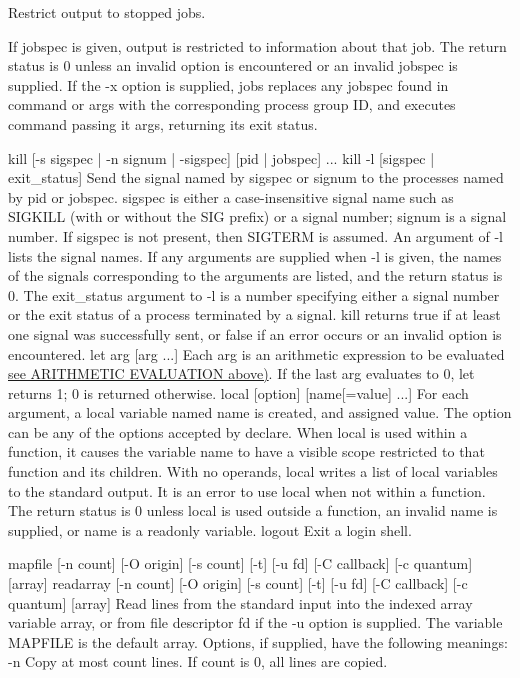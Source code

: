 Restrict output to stopped jobs.

If jobspec is given, output is restricted to information about that job. The return status is 0 unless an invalid option is encountered or an invalid jobspec is supplied.
If the -x option is supplied, jobs replaces any jobspec found in command or args with the corresponding process group ID, and executes command passing it args, returning its exit status.

kill [-s sigspec | -n signum | -sigspec] [pid | jobspec] ...
kill -l [sigspec | exit\_status]
Send the signal named by sigspec or signum to the processes named by pid or jobspec. sigspec is either a case-insensitive signal name such as SIGKILL (with or without the SIG prefix) or a signal number; signum is a signal number. If sigspec is not present, then SIGTERM is assumed. An argument of -l lists the signal names. If any arguments are supplied when -l is given, the names of the signals corresponding to the arguments are listed, and the return status is 0. The exit\_status argument to -l is a number specifying either a signal number or the exit status of a process terminated by a signal. kill returns true if at least one signal was successfully sent, or false if an error occurs or an invalid option is encountered.
let arg [arg ...]
Each arg is an arithmetic expression to be evaluated \hyperref[sec:arithmeticevaluation]{see ARITHMETIC EVALUATION above)}. If the last arg evaluates to 0, let returns 1; 0 is returned otherwise.
local [option] [name[=value] ...]
For each argument, a local variable named name is created, and assigned value. The option can be any of the options accepted by declare. When local is used within a function, it causes the variable name to have a visible scope restricted to that function and its children. With no operands, local writes a list of local variables to the standard output. It is an error to use local when not within a function. The return status is 0 unless local is used outside a function, an invalid name is supplied, or name is a readonly variable.
logout
Exit a login shell.

mapfile [-n count] [-O origin] [-s count] [-t] [-u fd] [-C callback] [-c quantum] [array]
readarray [-n count] [-O origin] [-s count] [-t] [-u fd] [-C callback] [-c quantum] [array]
Read lines from the standard input into the indexed array variable array, or from file descriptor fd if the -u option is supplied. The variable MAPFILE is the default array. Options, if supplied, have the following meanings:
-n
Copy at most count lines. If count is 0, all lines are copied.

